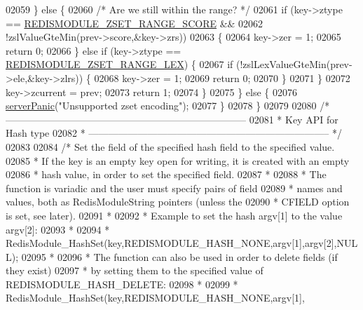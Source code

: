 \begin{DoxyCode}
{{{02059         \} \textcolor{keywordflow}{else} \{
02060             \textcolor{comment}{/* Are we still within the range? */}
02061             \textcolor{keywordflow}{if} (key->ztype == \hyperlink{module_8c_a103d0f18dc1536298a03324d5ba545be}{REDISMODULE\_ZSET\_RANGE\_SCORE} &&
02062                 !zslValueGteMin(prev->score,&key->zrs))
02063             \{
02064                 key->zer = 1;
02065                 \textcolor{keywordflow}{return} 0;
02066             \} \textcolor{keywordflow}{else} \textcolor{keywordflow}{if} (key->ztype == \hyperlink{module_8c_a36d7bac3b2781ba9b076ee6feee141a1}{REDISMODULE\_ZSET\_RANGE\_LEX}) \{
02067                 \textcolor{keywordflow}{if} (!zslLexValueGteMin(prev->ele,&key->zlrs)) \{
02068                     key->zer = 1;
02069                     \textcolor{keywordflow}{return} 0;
02070                 \}
02071             \}
02072             key->zcurrent = prev;
02073             \textcolor{keywordflow}{return} 1;
02074         \}
02075     \} \textcolor{keywordflow}{else} \{
02076         \hyperlink{server_8h_a11cc378e7778a830b41240578de3b204}{serverPanic}(\textcolor{stringliteral}{"Unsupported zset encoding"});
02077     \}
02078 \}
02079 
02080 \textcolor{comment}{/* --------------------------------------------------------------------------}
02081 \textcolor{comment}{ * Key API for Hash type}
02082 \textcolor{comment}{ * -------------------------------------------------------------------------- */}
02083 
02084 \textcolor{comment}{/* Set the field of the specified hash field to the specified value.}
02085 \textcolor{comment}{ * If the key is an empty key open for writing, it is created with an empty}
02086 \textcolor{comment}{ * hash value, in order to set the specified field.}
02087 \textcolor{comment}{ *}
02088 \textcolor{comment}{ * The function is variadic and the user must specify pairs of field}
02089 \textcolor{comment}{ * names and values, both as RedisModuleString pointers (unless the}
02090 \textcolor{comment}{ * CFIELD option is set, see later).}
02091 \textcolor{comment}{ *}
02092 \textcolor{comment}{ * Example to set the hash argv[1] to the value argv[2]:}
02093 \textcolor{comment}{ *}
02094 \textcolor{comment}{ *      RedisModule\_HashSet(key,REDISMODULE\_HASH\_NONE,argv[1],argv[2],NULL);}
02095 \textcolor{comment}{ *}
02096 \textcolor{comment}{ * The function can also be used in order to delete fields (if they exist)}
02097 \textcolor{comment}{ * by setting them to the specified value of REDISMODULE\_HASH\_DELETE:}
02098 \textcolor{comment}{ *}
02099 \textcolor{comment}{ *      RedisModule\_HashSet(key,REDISMODULE\_HASH\_NONE,argv[1],}
}}}
\end{DoxyCode}
